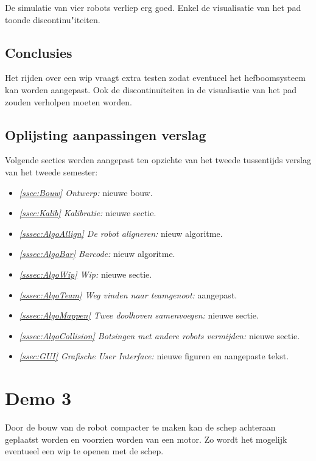 \documentclass[eind]{penoverslag}
\begin{document}
De simulatie van vier robots verliep erg goed. Enkel de visualisatie van het pad toonde discontinu"iteiten.

\subsection{Conclusies}
\label{Assec:conc2}
Het rijden over een wip vraagt extra testen zodat eventueel het hefboomsysteem kan worden aangepast. Ook de discontinu\"iteiten in de visualisatie van het pad zouden verholpen moeten worden.

\subsection{Oplijsting aanpassingen verslag}
\label{Assec:aanp2}
Volgende secties werden aangepast ten opzichte van het tweede tussentijds verslag van het tweede semester:

\begin{itemize}
\item \textit{\ref{ssec:Bouw} Ontwerp:} nieuwe bouw.
\item \textit{\ref{ssec:Kalib} Kalibratie:} nieuwe sectie.
\item \textit{\ref{sssec:AlgoAllign} De robot aligneren:} nieuw algoritme.
\item \textit{\ref{sssec:AlgoBar} Barcode:} nieuw algoritme.
\item \textit{\ref{sssec:AlgoWip} Wip:} nieuwe sectie.
\item \textit{\ref{sssec:AlgoTeam} Weg vinden naar teamgenoot:} aangepast.
\item \textit{\ref{sssec:AlgoMappen} Twee doolhoven samenvoegen:} nieuwe sectie.
\item \textit{\ref{sssec:AlgoCollision} Botsingen met andere robots vermijden:} nieuwe sectie.
\item \textit{\ref{ssec:GUI} Grafische User Interface:} nieuwe figuren en aangepaste tekst.
\end{itemize}

\section{Demo 3}
\label{Asec:demo3}
Door de bouw van de robot compacter te maken kan de schep achteraan geplaatst worden en voorzien worden van een motor. Zo wordt het mogelijk eventueel een wip te openen met de schep.
\end{document}
